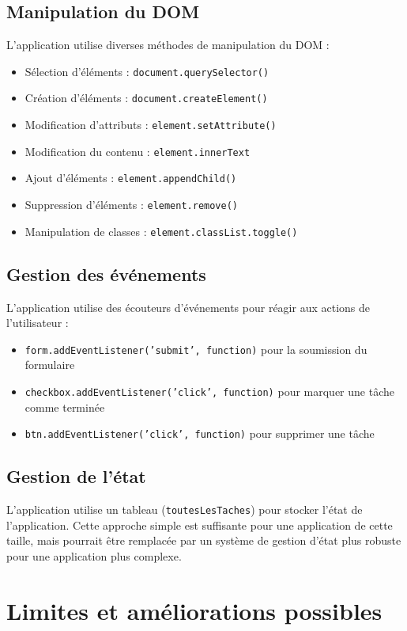 \documentclass{article}
\begin{document}
\subsection{Manipulation du DOM}
L'application utilise diverses méthodes de manipulation du DOM :
\begin{itemize}
    \item Sélection d'éléments : \texttt{document.querySelector()}
    \item Création d'éléments : \texttt{document.createElement()}
    \item Modification d'attributs : \texttt{element.setAttribute()}
    \item Modification du contenu : \texttt{element.innerText}
    \item Ajout d'éléments : \texttt{element.appendChild()}
    \item Suppression d'éléments : \texttt{element.remove()}
    \item Manipulation de classes : \texttt{element.classList.toggle()}
\end{itemize}

\subsection{Gestion des événements}
L'application utilise des écouteurs d'événements pour réagir aux actions de l'utilisateur :
\begin{itemize}
    \item \texttt{form.addEventListener('submit', function)} pour la soumission du formulaire
    \item \texttt{checkbox.addEventListener('click', function)} pour marquer une tâche comme terminée
    \item \texttt{btn.addEventListener('click', function)} pour supprimer une tâche
\end{itemize}

\subsection{Gestion de l'état}
L'application utilise un tableau (\texttt{toutesLesTaches}) pour stocker l'état de l'application. Cette approche simple est suffisante pour une application de cette taille, mais pourrait être remplacée par un système de gestion d'état plus robuste pour une application plus complexe.

\section{Limites et améliorations possibles}
\end{document}
